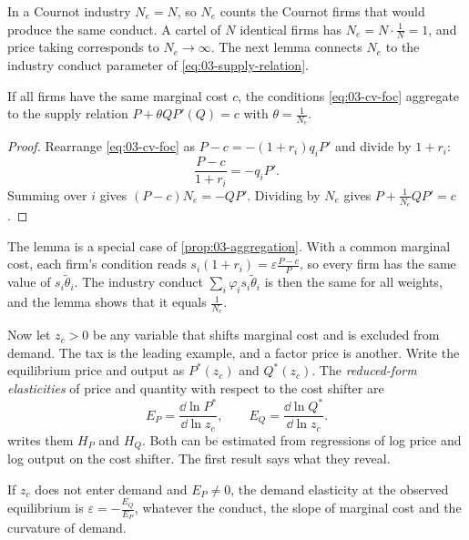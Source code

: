 In a Cournot industry $N_e = N$, so $N_e$ counts the Cournot firms that would produce the same conduct. A
cartel of $N$ identical firms has $N_e = N \cdot \frac{1}{N} = 1$, and price taking corresponds to $N_e \to
\infty$. The next lemma connects $N_e$ to the industry conduct parameter of \eqref{eq:03-supply-relation}.

\begin{lemma}\label{lem:03-cv-aggregation}
If all firms have the same marginal cost $c$, the conditions \eqref{eq:03-cv-foc} aggregate to the supply
relation $P + \theta Q P'(Q) = c$ with $\theta = \frac{1}{N_e}$.
\end{lemma}

\begin{proof}
Rearrange \eqref{eq:03-cv-foc} as $P - c = -(1 + r_i) q_i P'$ and divide by $1 + r_i$:
\begin{equation*}
  \frac{P - c}{1 + r_i} = -q_i P'.
\end{equation*}
Summing over $i$ gives $(P - c) N_e = -Q P'$. Dividing by $N_e$ gives $P + \frac{1}{N_e} Q P' = c$.
\end{proof}

The lemma is a special case of \cref{prop:03-aggregation}. With a common marginal cost, each firm's condition reads
$s_i(1 + r_i) = \varepsilon\frac{P - c}{P}$, so every firm has the same value of $s_i\tilde\theta_i$. The industry
conduct $\sum_i \varphi_i s_i \tilde\theta_i$ is then the same for all weights, and the lemma shows that it equals
$\frac{1}{N_e}$.

Now let $z_c > 0$ be any variable that shifts marginal cost and is excluded from demand. The tax is the
leading example, and a factor price is another. Write the equilibrium price and output as $P^*(z_c)$ and
$Q^*(z_c)$. The \emph{reduced-form elasticities} of price and quantity with respect to the cost shifter are
\begin{equation}\label{eq:03-EP-EQ}
  E_P = \frac{\dd \ln P^*}{\dd \ln z_c}, \qquad E_Q = \frac{\dd \ln Q^*}{\dd \ln z_c}.
\end{equation}
\citet{Bresnahan1989} writes them $H_P$ and $H_Q$. Both can be estimated from regressions of log price and log
output on the cost shifter. The first result says what they reveal.

\begin{lemma}\label{lem:03-trace-demand}
If $z_c$ does not enter demand and $E_P \neq 0$, the demand elasticity at the observed equilibrium is
$\varepsilon = -\frac{E_Q}{E_P}$, whatever the conduct, the slope of marginal cost and the curvature of
demand.
\end{lemma}

